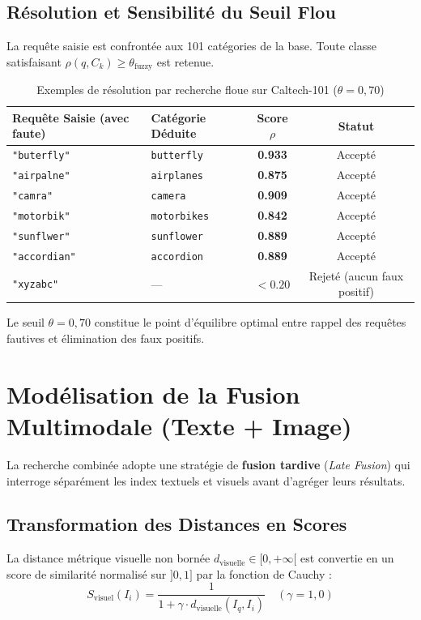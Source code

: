 \subsection{Résolution et Sensibilité du Seuil Flou}
La requête saisie est confrontée aux 101 catégories de la base. Toute classe satisfaisant $\rho(q, C_k) \ge \theta_{\text{fuzzy}}$ est retenue.

\begin{table}[H]
    \centering
    \caption{Exemples de résolution par recherche floue sur Caltech-101 ($\theta = 0{,}70$)}
    \label{tab:fuzzy_exemples_compact}
    \begin{tabular}{llcc}
        \toprule
        \textbf{Requête Saisie (avec faute)} & \textbf{Catégorie Déduite} & \textbf{Score $\rho$} & \textbf{Statut} \\
        \midrule
        \texttt{"buterfly"}  & \texttt{butterfly}   & \textbf{0.933} & Accepté \\
        \texttt{"airpalne"}  & \texttt{airplanes}   & \textbf{0.875} & Accepté \\
        \texttt{"camra"}     & \texttt{camera}      & \textbf{0.909} & Accepté \\
        \texttt{"motorbik"}  & \texttt{motorbikes}  & \textbf{0.842} & Accepté \\
        \texttt{"sunflwer"}  & \texttt{sunflower}   & \textbf{0.889} & Accepté \\
        \texttt{"accordian"} & \texttt{accordion}   & \textbf{0.889} & Accepté \\
        \texttt{"xyzabc"}    & —                    & $< 0.20$       & Rejeté (aucun faux positif) \\
        \bottomrule
    \end{tabular}
\end{table}

Le seuil $\theta = 0{,}70$ constitue le point d'équilibre optimal entre rappel des requêtes fautives et élimination des faux positifs.

\section{Modélisation de la Fusion Multimodale (Texte + Image)}

La recherche combinée adopte une stratégie de \textbf{fusion tardive} (\textit{Late Fusion}) qui interroge séparément les index textuels et visuels avant d'agréger leurs résultats.

\subsection{Transformation des Distances en Scores}
La distance métrique visuelle non bornée $d_{\text{visuelle}} \in [0, +\infty[$ est convertie en un score de similarité normalisé sur $]0, 1]$ par la fonction de Cauchy :
\begin{equation}
    S_{\text{visuel}}(I_i) = \frac{1}{1 + \gamma \cdot d_{\text{visuelle}}(I_q, I_i)} \quad (\gamma = 1{,}0)
\end{equation}

